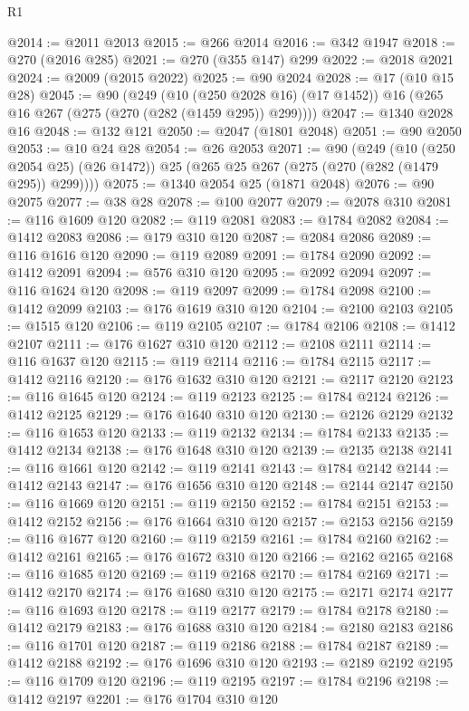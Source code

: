 \begin{lexlean}{R1}
\begin{coremodule}
@2014 := @2011 @2013
@2015 := @266 @2014
@2016 := @342 @1947
@2018 := @270 (@2016 @285)
@2021 := @270 (@355 @147) @299
@2022 := @2018 @2021
@2024 := @2009 (@2015 @2022)
@2025 := @90 @2024
@2028 := @17 (@10 @15 @28)
@2045 := @90
    (@249
      (@10 (@250 @2028 @16) (@17 @1452))
      @16
      (@265 @16 @267 (@275 (@270 (@282 (@1459 @295)) @299))))
@2047 := @1340 @2028 @16
@2048 := @132 @121
@2050 := @2047 (@1801 @2048)
@2051 := @90 @2050
@2053 := @10 @24 @28
@2054 := @26 @2053
@2071 := @90
    (@249
      (@10 (@250 @2054 @25) (@26 @1472))
      @25
      (@265 @25 @267 (@275 (@270 (@282 (@1479 @295)) @299))))
@2075 := @1340 @2054 @25 (@1871 @2048)
@2076 := @90 @2075
@2077 := @38 @28
@2078 := @100 @2077
@2079 := @2078 @310
@2081 := @116 @1609 @120
@2082 := @119 @2081
@2083 := @1784 @2082
@2084 := @1412 @2083
@2086 := @179 @310 @120
@2087 := @2084 @2086
@2089 := @116 @1616 @120
@2090 := @119 @2089
@2091 := @1784 @2090
@2092 := @1412 @2091
@2094 := @576 @310 @120
@2095 := @2092 @2094
@2097 := @116 @1624 @120
@2098 := @119 @2097
@2099 := @1784 @2098
@2100 := @1412 @2099
@2103 := @176 @1619 @310 @120
@2104 := @2100 @2103
@2105 := @1515 @120
@2106 := @119 @2105
@2107 := @1784 @2106
@2108 := @1412 @2107
@2111 := @176 @1627 @310 @120
@2112 := @2108 @2111
@2114 := @116 @1637 @120
@2115 := @119 @2114
@2116 := @1784 @2115
@2117 := @1412 @2116
@2120 := @176 @1632 @310 @120
@2121 := @2117 @2120
@2123 := @116 @1645 @120
@2124 := @119 @2123
@2125 := @1784 @2124
@2126 := @1412 @2125
@2129 := @176 @1640 @310 @120
@2130 := @2126 @2129
@2132 := @116 @1653 @120
@2133 := @119 @2132
@2134 := @1784 @2133
@2135 := @1412 @2134
@2138 := @176 @1648 @310 @120
@2139 := @2135 @2138
@2141 := @116 @1661 @120
@2142 := @119 @2141
@2143 := @1784 @2142
@2144 := @1412 @2143
@2147 := @176 @1656 @310 @120
@2148 := @2144 @2147
@2150 := @116 @1669 @120
@2151 := @119 @2150
@2152 := @1784 @2151
@2153 := @1412 @2152
@2156 := @176 @1664 @310 @120
@2157 := @2153 @2156
@2159 := @116 @1677 @120
@2160 := @119 @2159
@2161 := @1784 @2160
@2162 := @1412 @2161
@2165 := @176 @1672 @310 @120
@2166 := @2162 @2165
@2168 := @116 @1685 @120
@2169 := @119 @2168
@2170 := @1784 @2169
@2171 := @1412 @2170
@2174 := @176 @1680 @310 @120
@2175 := @2171 @2174
@2177 := @116 @1693 @120
@2178 := @119 @2177
@2179 := @1784 @2178
@2180 := @1412 @2179
@2183 := @176 @1688 @310 @120
@2184 := @2180 @2183
@2186 := @116 @1701 @120
@2187 := @119 @2186
@2188 := @1784 @2187
@2189 := @1412 @2188
@2192 := @176 @1696 @310 @120
@2193 := @2189 @2192
@2195 := @116 @1709 @120
@2196 := @119 @2195
@2197 := @1784 @2196
@2198 := @1412 @2197
@2201 := @176 @1704 @310 @120

\end{coremodule}
\end{lexlean}
